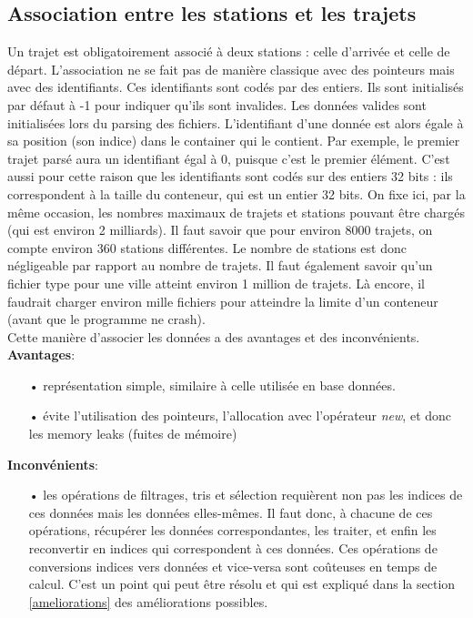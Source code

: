 \documentclass[12pt]{article}
\begin{document}
		\subsection{Association entre les stations et les trajets}
		Un trajet est obligatoirement associé à deux stations : celle d’arrivée et celle de départ.
	L’association ne se fait pas de manière classique avec des pointeurs mais avec des identifiants. Ces identifiants sont codés par des entiers. Ils sont initialisés par défaut à -1 pour indiquer qu’ils sont invalides. Les données valides sont initialisées lors du parsing des fichiers. L’identifiant d’une donnée est alors égale à sa position (son indice) dans le container qui le contient. Par exemple, le premier trajet parsé aura un identifiant égal à 0, puisque c’est le premier élément. C’est aussi pour cette raison que les identifiants sont codés sur des entiers 32 bits : ils correspondent à la taille du conteneur, qui est un entier 32 bits. On fixe ici, par la même occasion, les nombres maximaux de trajets et stations pouvant être chargés (qui est environ 2 milliards). Il faut savoir que pour environ 8000 trajets, on compte environ 360 stations différentes. Le nombre de stations est donc négligeable par rapport au nombre de trajets. Il faut également savoir qu’un fichier type pour une ville atteint environ 1 million de trajets. Là encore, il faudrait charger environ mille fichiers pour atteindre la limite d’un conteneur (avant que le programme ne crash).\\
	
	Cette manière d’associer les données a des avantages et des inconvénients.\\
			
		\textbf{Avantages}:
		\begin{itemize}
			\item[•] représentation simple, similaire à celle utilisée en base données.
			\item[•] évite l'utilisation des pointeurs, l’allocation avec l’opérateur \textit{new}, et donc les memory leaks (fuites de mémoire)
		\end{itemize}
			
		\textbf{Inconvénients}:
		\begin{itemize}
			\item[•] les opérations de filtrages, tris et sélection requièrent non pas les
			indices de ces données mais les données elles-mêmes. Il faut donc, à chacune de
			ces opérations, récupérer les données correspondantes, les traiter, et enfin
			les reconvertir en indices qui correspondent à ces données. Ces opérations
			de conversions indices vers données et vice-versa sont coûteuses en temps
			de calcul. C’est un point qui peut être résolu et qui est expliqué dans
			la section \ref{ameliorations} des améliorations possibles.
		\end{itemize}
			
\end{document}
